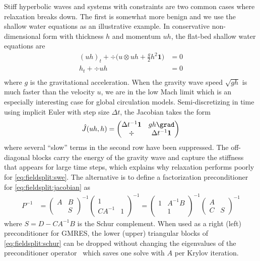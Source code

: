 Stiff hyperbolic waves and systems with constraints are two common cases where relaxation breaks down.
The first is somewhat more benign and we use the shallow water equations as an illustrative example.
In conservative non-dimensional form with thickness $h$ and momentum $uh$, the flat-bed shallow water equations are
\begin{align*}
  (uh)_t + \div \Big( u\otimes uh + \frac g 2 h^2 \bm 1 \Big) & = 0 \\
  h_t + \div uh & = 0 \\
\end{align*}
where $g$ is the gravitational acceleration.
When the gravity wave speed $\sqrt{gh}$ is much faster than the velocity $u$, we are in the low Mach limit which is an especially interesting case for global circulation models.
Semi-discretizing in time using implicit Euler with step size $\Delta t$, the Jacobian takes the form
\begin{align}\label{eq:fieldsplit:swe}
  \hat J(uh,h) =
  \begin{pmatrix}
    \Delta t^{-1} \bm 1 & g h \grad \\
    \div & \Delta t^{-1} \bm 1
  \end{pmatrix}
\end{align}
where several ``slow'' terms in the second row have been suppressed.
The off-diagonal blocks carry the energy of the gravity wave and capture the stiffness that appears for large time steps, which explains why relaxation performs poorly for \eqref{eq:fieldsplit:swe}.
The alternative is to define a factorization preconditioner for \eqref{eq:fieldsplit:jacobian} as
\begin{align}\label{eq:fieldsplit:schur}
  P^{-1} & =
  \begin{pmatrix} A & B \\ & S \end{pmatrix}^{-1}
  \begin{pmatrix} 1 & \\ CA^{-1} & 1 \end{pmatrix}^{-1}
  =
  \begin{pmatrix} 1 & A^{-1} B \\  & 1 \end{pmatrix}^{-1}
  \begin{pmatrix} A & \\ C & S \end{pmatrix}^{-1}
\end{align}
where $S = D - C A^{-1} B$ is the Schur complement.
When used as a right (left) preconditioner for GMRES, the lower (upper) triangular blocks of \eqref{eq:fieldsplit:schur} can be dropped without changing the eigenvalues of the preconditioner operator~\cite{murphy2000npi,ipsen2001note} which saves one solve with $A$ per Krylov iteration.
